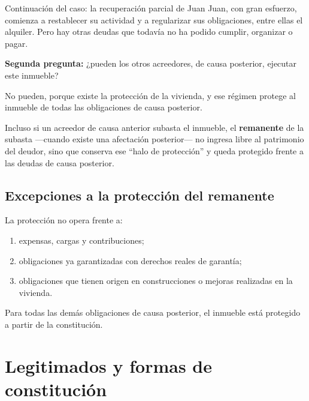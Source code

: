 \documentclass[12pt,oneside]{book}
\begin{document}

\begin{example}{Continuaci\'on del caso: la recuperaci\'on parcial de Juan}
Juan, con gran esfuerzo, comienza a restablecer su actividad y a regularizar sus obligaciones, entre ellas el alquiler. Pero hay otras deudas que todav\'ia no ha podido cumplir, organizar o pagar.
\end{example}

\textbf{Segunda pregunta:} ¿pueden los otros acreedores, de causa posterior, ejecutar este inmueble?

No pueden, porque existe la protecci\'on de la vivienda, y ese r\'egimen protege al inmueble de todas las obligaciones de causa posterior.

\begin{important}
Incluso si un acreedor de causa anterior subasta el inmueble, el \textbf{remanente} de la subasta ---cuando existe una afectaci\'on posterior--- no ingresa libre al patrimonio del deudor, sino que conserva ese ``halo de protecci\'on'' y queda protegido frente a las deudas de causa posterior.
\end{important}

\subsection{Excepciones a la protecci\'on del remanente}

La protecci\'on no opera frente a:

\begin{enumerate}[label=(\roman*)]
    \item expensas, cargas y contribuciones;
    \item obligaciones ya garantizadas con derechos reales de garant\'ia;
    \item obligaciones que tienen origen en construcciones o mejoras realizadas en la vivienda.
\end{enumerate}

Para todas las dem\'as obligaciones de causa posterior, el inmueble est\'a protegido a partir de la constituci\'on.

\section{Legitimados y formas de constituci\'on}
\end{document}
